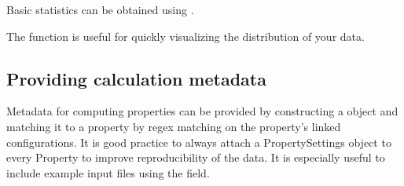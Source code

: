 \documentclass[letterpaper,10pt,english]{sphinxmanual}
\begin{document}
\begin{sphinxVerbatim}[commandchars=\\\{\}]
   
     
\end{sphinxVerbatim}

\sphinxAtStartPar
Basic statistics can be obtained using
{\hyperref[\detokenize{dataset:colabfit.tools.dataset.Dataset.get_statistics}]{}}.

\begin{sphinxVerbatim}[commandchars=\\\{\}]
\end{sphinxVerbatim}

\sphinxAtStartPar
The {\hyperref[\detokenize{dataset:colabfit.tools.dataset.Dataset.plot_histograms}]{}} function is useful
for quickly visualizing the distribution of your data.

\begin{sphinxVerbatim}[commandchars=\\\{\}]
\PYG{p}{[} \PYG{p}{]}
\end{sphinxVerbatim}


\subsection{Providing calculation metadata}
\label{\detokenize{basic_example:providing-calculation-metadata}}
\sphinxAtStartPar
Metadata for computing properties can be provided by constructing a
{\hyperref[\detokenize{property_settings:colabfit.tools.property_settings.PropertySettings}]{}} object and matching
it to a property by regex matching on the property’s linked configurations.
It is good practice to always attach a PropertySettings object to every
Property to improve reproducibility of the data. It is especially useful to
include example input files using the  field.
\end{document}
